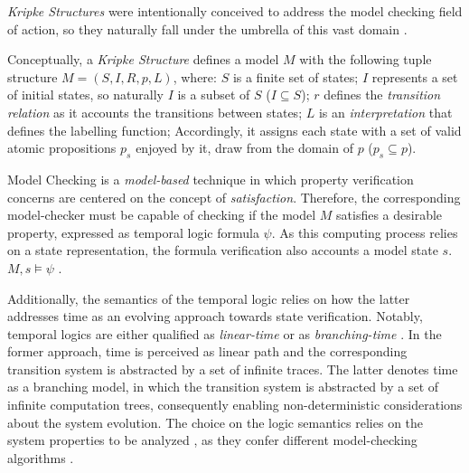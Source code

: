 \textit{Kripke Structures} were intentionally conceived to address the model checking field of action, so they naturally fall under the umbrella of this vast domain \cite{muller1999model}.

Conceptually, a \textit{Kripke Structure} defines a model $M$ with the following tuple structure $M = (S,I,R,p,L)$, where: $S$ is a finite set of states; $I$ represents a set of initial states, so naturally $I$ is a subset of $S$ ($I \subseteq S$); $r$ defines the \textit{transition relation} as it accounts the transitions between states; $L$ is an \textit{interpretation} that defines the labelling function; Accordingly, it assigns each state with a set of valid atomic propositions $p_{s}$ enjoyed by it, draw from the domain of $p$ ($p_{s} \subseteq p$). 

\vspace{0.5cm}

Model Checking is a \textit{model-based} technique in which property verification concerns are centered on the concept of \textit{satisfaction}. Therefore, the corresponding model-checker must be capable of checking if the model $M$ satisfies a desirable property, expressed as temporal logic formula $\psi$. As this computing process relies on a state representation, the formula verification also accounts a model state $s$. $M,s \models \psi$ \cite{huth2004logic, muller1999model}.

Additionally, the semantics of the temporal logic relies on how the latter addresses time as an evolving approach towards state verification. Notably, temporal logics are either qualified as \textit{linear-time} or as \textit{branching-time} \cite{huth2004logic}. In the former approach, time is perceived as linear path and the corresponding transition system is abstracted by a set of infinite traces. The latter denotes time as a branching model, in which the transition system is abstracted by a set of infinite computation trees, consequently enabling non-deterministic considerations about the system evolution. The choice on the logic semantics relies on the system properties to be analyzed \cite{muller1999model}, as they confer different model-checking algorithms \cite{huth2004logic}. 


